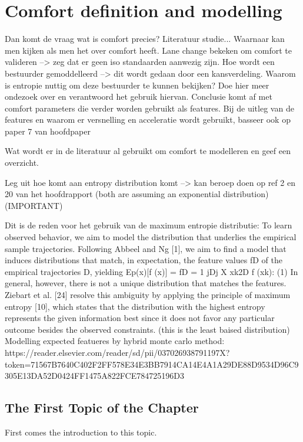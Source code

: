 \chapter{Comfort definition and modelling}
\label{cha:1}

Dan komt de vraag wat is comfort precies? Literatuur studie...
Waarnaar kan men kijken als men het over comfort heeft. 
Lane change bekeken om comfort te valideren --> zeg dat er geen iso standaarden aanwezig zijn.
Hoe wordt een bestuurder gemoddelleerd --> dit wordt gedaan door een kansverdeling.
Waarom is entropie nuttig om deze bestuurder te kunnen bekijken? Doe hier meer ondezoek over en verantwoord het gebruik hiervan. Conclusie komt af met comfort parameters die verder worden gebruikt als features.
Bij de uitleg van de features en waarom er versnelling en acceleratie wordt gebruikt, basseer ook op paper 7 van hoofdpaper

Wat wordt er in de literatuur al gebruikt om comfort te modelleren en geef een overzicht.

Leg uit hoe komt aan entropy distribution komt --> kan beroep doen op ref 2 en 20 van het hoofdrapport (both are assuming an exponential distribution) (IMPORTANT)


Dit is de reden voor het gebruik van de maximum entropie distributie: 
	To learn observed behavior, we aim to model the distribution
	that underlies the empirical sample trajectories.
	Following Abbeel and Ng [1], we aim to find a model that
	induces distributions that match, in expectation, the feature
	values fD of the empirical trajectories D, yielding
	Ep(x)[f (x)] = fD =
	1
	jDj
	X
	xk2D
	f (xk): (1)
	In general, however, there is not a unique distribution that
	matches the features. Ziebart et al. [24] resolve this ambiguity
	by applying the principle of maximum entropy [10], which
	states that the distribution with the highest entropy represents
	the given information best since it does not favor any
	particular outcome besides the observed constraints. (this is the least baised distribution)
	Modelling expected featueres by hybrid monte carlo method: https://reader.elsevier.com/reader/sd/pii/037026938791197X?token=71567B7640C402F2FF578E34E3BB7914CA14E4A1A29DE88D9534D96C9305E13DA52D0424FF1475A822FCE784725196D3




\section{The First Topic of the Chapter}
First comes the introduction to this topic.


